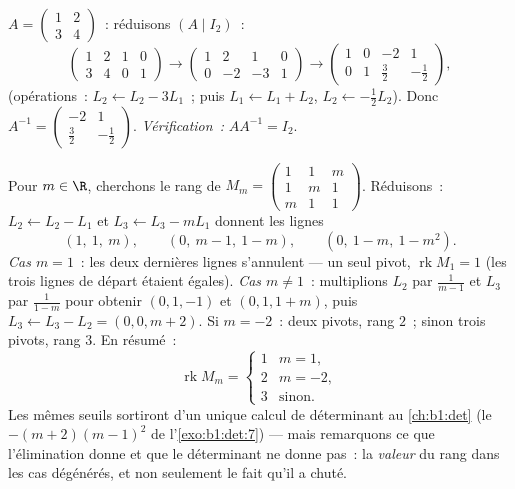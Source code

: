 \begin{example}\label{ex:b1:matrices:inverse}
$A = \begin{pmatrix} 1 & 2 \\ 3 & 4 \end{pmatrix}$~: réduisons $(A \mid
I_2)$~:
\[
\begin{pmatrix} 1 & 2 & 1 & 0\\ 3 & 4 & 0 & 1 \end{pmatrix}
\to
\begin{pmatrix} 1 & 2 & 1 & 0\\ 0 & -2 & -3 & 1 \end{pmatrix}
\to
\begin{pmatrix} 1 & 0 & -2 & 1\\ 0 & 1 & \tfrac32 & -\tfrac12
\end{pmatrix},
\]
(opérations~: $L_2 \leftarrow L_2 - 3L_1$~; puis $L_1 \leftarrow L_1
+ L_2$, $L_2 \leftarrow -\frac12 L_2$). Donc $A^{-1} =
\begin{pmatrix} -2 & 1 \\ \tfrac32 & -\tfrac12\end{pmatrix}$.
\emph{Vérification~:} $AA^{-1} = I_2$.
\end{example}

\begin{example}
\label{ex:b1:matrices:rankparameter}
Pour $m \in \R$, cherchons le rang de
$M_m = \begin{pmatrix} 1 & 1 & m\\ 1 & m & 1\\ m & 1 &
1\end{pmatrix}$. Réduisons~: $L_2 \leftarrow L_2 - L_1$ et $L_3
\leftarrow L_3 - mL_1$ donnent les lignes
\[
(1,\ 1,\ m), \qquad (0,\ m - 1,\ 1 - m), \qquad
(0,\ 1 - m,\ 1 - m^2).
\]
\emph{Cas $m = 1$}~: les deux dernières lignes s'annulent --- un seul
pivot, $\operatorname{rk} M_1 = 1$ (les trois lignes de départ étaient
égales). \emph{Cas $m \neq 1$}~: multiplions $L_2$ par $\frac1{m-1}$ et
$L_3$ par $\frac1{1-m}$ pour obtenir $(0, 1, -1)$ et $(0, 1, 1 + m)$,
puis $L_3 \leftarrow L_3 - L_2 = (0, 0, m + 2)$. Si $m = -2$~:
deux pivots, rang $2$~; sinon trois pivots, rang $3$. En résumé~:
\[
\operatorname{rk} M_m =
\begin{cases}
1 & m = 1,\\
2 & m = -2,\\
3 & \text{sinon}.
\end{cases}
\]
Les mêmes seuils sortiront d'un unique calcul de déterminant au
\cref{ch:b1:det} (le  $-(m+2)(m-1)^2$ de
l'\cref{exo:b1:det:7}) --- mais remarquons ce que l'élimination donne
et que le déterminant ne donne pas~: la \emph{valeur} du rang dans les
cas dégénérés, et non seulement le fait qu'il a chuté.
\end{example}

